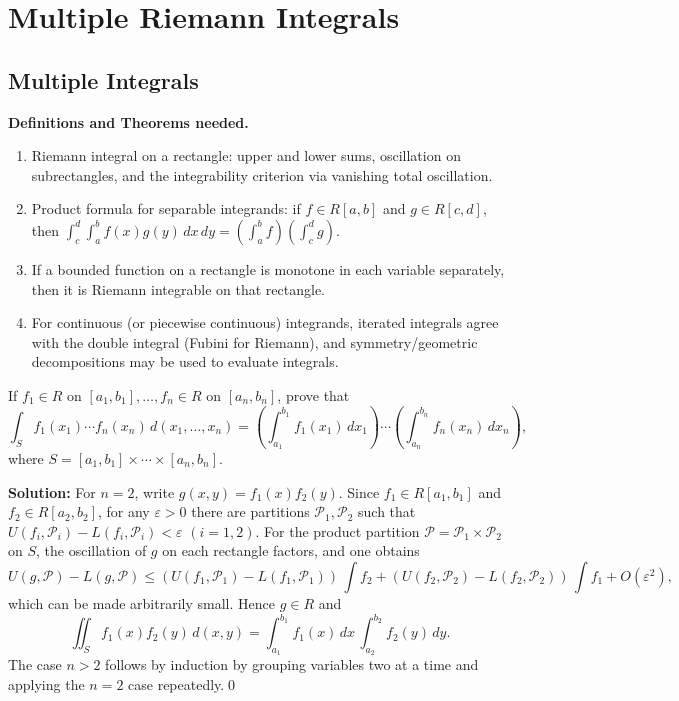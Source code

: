 \chapter{Multiple Riemann Integrals}
\section{Multiple Integrals}
\noindent\textbf{Definitions and Theorems needed.}
\begin{enumerate}[label=(\roman*)]
    \item Riemann integral on a rectangle: upper and lower sums, oscillation on subrectangles, and the integrability criterion via vanishing total oscillation.
    \item Product formula for separable integrands: if $f \in R[a,b]$ and $g \in R[c,d]$, then $\int_c^d \! \int_a^b f(x)g(y)\,dx\,dy = \left(\int_a^b f\right)\!\left(\int_c^d g\right)$.
    \item If a bounded function on a rectangle is monotone in each variable separately, then it is Riemann integrable on that rectangle.
    \item For continuous (or piecewise continuous) integrands, iterated integrals agree with the double integral (Fubini for Riemann), and symmetry/geometric decompositions may be used to evaluate integrals.
\end{enumerate}



\begin{problembox}
If \( f_1 \in R \) on \([a_1, b_1], \ldots, f_n \in R \) on \([a_n, b_n]\), prove that
\[ \int_{S} f_1(x_1) \cdots f_n(x_n) \, d(x_1, \ldots, x_n) = \left( \int_{a_1}^{b_1} f_1(x_1) \, dx_1 \right) \cdots \left( \int_{a_n}^{b_n} f_n(x_n) \, dx_n \right), \]
where \( S = [a_1, b_1] \times \cdots \times [a_n, b_n] \).
\end{problembox}

\noindent\textbf{Solution:}
For $n=2$, write $g(x,y)=f_1(x)f_2(y)$. Since $f_1\in R[a_1,b_1]$ and $f_2\in R[a_2,b_2]$, for any $\varepsilon>0$ there are partitions $\mathcal P_1,\mathcal P_2$ such that $U(f_i,\mathcal P_i)-L(f_i,\mathcal P_i)<\varepsilon$ $(i=1,2)$. For the product partition $\mathcal P=\mathcal P_1\times\mathcal P_2$ on $S$, the oscillation of $g$ on each rectangle factors, and one obtains
\[ U(g,\mathcal P)-L(g,\mathcal P) \le (U(f_1,\mathcal P_1)-L(f_1,\mathcal P_1))\,\int f_2 + (U(f_2,\mathcal P_2)-L(f_2,\mathcal P_2))\,\int f_1 + O(\varepsilon^2), \]
which can be made arbitrarily small. Hence $g\in R$ and
\[ \iint_S f_1(x)f_2(y)\,d(x,y) = \int_{a_1}^{b_1} f_1(x)\,dx\,\int_{a_2}^{b_2} f_2(y)\,dy. \]
The case $n>2$ follows by induction by grouping variables two at a time and applying the $n=2$ case repeatedly.\qed


